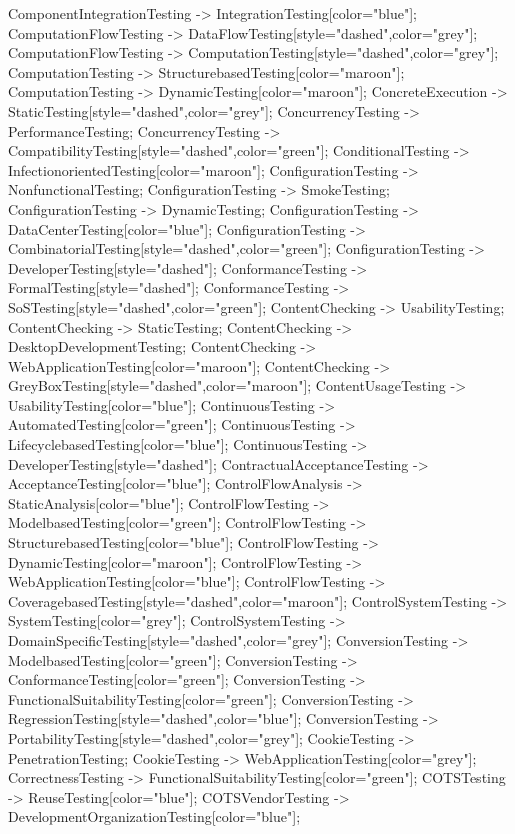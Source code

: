 \documentclass{article}
\begin{document}
{ComponentIntegrationTesting -> IntegrationTesting[color="blue"];
ComputationFlowTesting -> DataFlowTesting[style="dashed",color="grey"];
ComputationFlowTesting -> ComputationTesting[style="dashed",color="grey"];
ComputationTesting -> StructurebasedTesting[color="maroon"];
ComputationTesting -> DynamicTesting[color="maroon"];
ConcreteExecution -> StaticTesting[style="dashed",color="grey"];
ConcurrencyTesting -> PerformanceTesting;
ConcurrencyTesting -> CompatibilityTesting[style="dashed",color="green"];
ConditionalTesting -> InfectionorientedTesting[color="maroon"];
ConfigurationTesting -> NonfunctionalTesting;
ConfigurationTesting -> SmokeTesting;
ConfigurationTesting -> DynamicTesting;
ConfigurationTesting -> DataCenterTesting[color="blue"];
ConfigurationTesting -> CombinatorialTesting[style="dashed",color="green"];
ConfigurationTesting -> DeveloperTesting[style="dashed"];
ConformanceTesting -> FormalTesting[style="dashed"];
ConformanceTesting -> SoSTesting[style="dashed",color="green"];
ContentChecking -> UsabilityTesting;
ContentChecking -> StaticTesting;
ContentChecking -> DesktopDevelopmentTesting;
ContentChecking -> WebApplicationTesting[color="maroon"];
ContentChecking -> GreyBoxTesting[style="dashed",color="maroon"];
ContentUsageTesting -> UsabilityTesting[color="blue"];
ContinuousTesting -> AutomatedTesting[color="green"];
ContinuousTesting -> LifecyclebasedTesting[color="blue"];
ContinuousTesting -> DeveloperTesting[style="dashed"];
ContractualAcceptanceTesting -> AcceptanceTesting[color="blue"];
ControlFlowAnalysis -> StaticAnalysis[color="blue"];
ControlFlowTesting -> ModelbasedTesting[color="green"];
ControlFlowTesting -> StructurebasedTesting[color="blue"];
ControlFlowTesting -> DynamicTesting[color="maroon"];
ControlFlowTesting -> WebApplicationTesting[color="blue"];
ControlFlowTesting -> CoveragebasedTesting[style="dashed",color="maroon"];
ControlSystemTesting -> SystemTesting[color="grey"];
ControlSystemTesting -> DomainSpecificTesting[style="dashed",color="grey"];
ConversionTesting -> ModelbasedTesting[color="green"];
ConversionTesting -> ConformanceTesting[color="green"];
ConversionTesting -> FunctionalSuitabilityTesting[color="green"];
ConversionTesting -> RegressionTesting[style="dashed",color="blue"];
ConversionTesting -> PortabilityTesting[style="dashed",color="grey"];
CookieTesting -> PenetrationTesting;
CookieTesting -> WebApplicationTesting[color="grey"];
CorrectnessTesting -> FunctionalSuitabilityTesting[color="green"];
COTSTesting -> ReuseTesting[color="blue"];
COTSVendorTesting -> DevelopmentOrganizationTesting[color="blue"];
}
\end{document}
